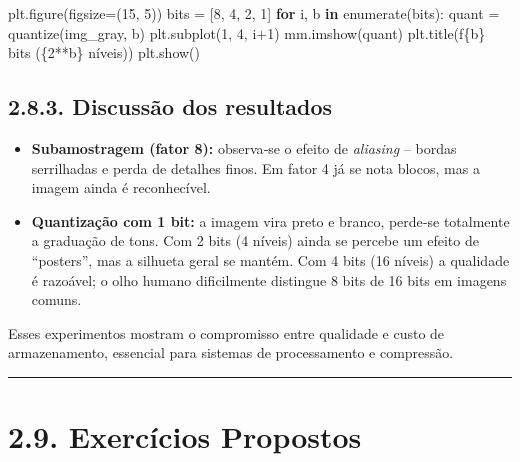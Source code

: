 \documentclass[
  portuguese,
  letterpaper,
  openany,
  oneside,
  12pt,
  a4paper]{book}
\newenvironment{Shaded}{\begin{snugshade}}{\end{snugshade}}
\newcommand{\BuiltInTok}[1]{\textcolor[rgb]{0.00,0.23,0.31}{#1}}
\newcommand{\ControlFlowTok}[1]{\textcolor[rgb]{0.00,0.23,0.31}{\textbf{#1}}}
\newcommand{\DecValTok}[1]{\textcolor[rgb]{0.68,0.00,0.00}{#1}}
\newcommand{\KeywordTok}[1]{\textcolor[rgb]{0.00,0.23,0.31}{\textbf{#1}}}
\newcommand{\NormalTok}[1]{\textcolor[rgb]{0.00,0.23,0.31}{#1}}
\newcommand{\OperatorTok}[1]{\textcolor[rgb]{0.37,0.37,0.37}{#1}}
\newcommand{\SpecialCharTok}[1]{\textcolor[rgb]{0.37,0.37,0.37}{#1}}
\newcommand{\SpecialStringTok}[1]{\textcolor[rgb]{0.13,0.47,0.30}{#1}}
\providecommand{\tightlist}{%
  \setlength{\itemsep}{0pt}\setlength{\parskip}{0pt}}
\begin{document}
\begin{tcolorbox}
\begin{Shaded}
\begin{Highlighting}[]
\NormalTok{plt.figure(figsize}\OperatorTok{=}\NormalTok{(}\DecValTok{15}\NormalTok{, }\DecValTok{5}\NormalTok{))}
\NormalTok{bits }\OperatorTok{=}\NormalTok{ [}\DecValTok{8}\NormalTok{, }\DecValTok{4}\NormalTok{, }\DecValTok{2}\NormalTok{, }\DecValTok{1}\NormalTok{]}
\ControlFlowTok{for}\NormalTok{ i, b }\KeywordTok{in} \BuiltInTok{enumerate}\NormalTok{(bits):}
\NormalTok{    quant }\OperatorTok{=}\NormalTok{ quantize(img\_gray, b)}
\NormalTok{    plt.subplot(}\DecValTok{1}\NormalTok{, }\DecValTok{4}\NormalTok{, i}\OperatorTok{+}\DecValTok{1}\NormalTok{)}
\NormalTok{    mm.imshow(quant)}
\NormalTok{    plt.title(}\SpecialStringTok{f\textquotesingle{}}\SpecialCharTok{\{}\NormalTok{b}\SpecialCharTok{\}}\SpecialStringTok{ bits (}\SpecialCharTok{\{}\DecValTok{2}\OperatorTok{**}\NormalTok{b}\SpecialCharTok{\}}\SpecialStringTok{ níveis)\textquotesingle{}}\NormalTok{)}
\NormalTok{plt.show()}
\end{Highlighting}
\end{Shaded}

\subsection{2.8.3. Discussão dos
resultados}\label{discussuxe3o-dos-resultados}

\begin{itemize}
\tightlist
\item
  \textbf{Subamostragem (fator 8):} observa‑se o efeito de
  \emph{aliasing} -- bordas serrilhadas e perda de detalhes finos. Em
  fator 4 já se nota blocos, mas a imagem ainda é reconhecível.
\item
  \textbf{Quantização com 1 bit:} a imagem vira preto e branco, perde‑se
  totalmente a graduação de tons. Com 2 bits (4 níveis) ainda se percebe
  um efeito de ``posters'', mas a silhueta geral se mantém. Com 4 bits
  (16 níveis) a qualidade é razoável; o olho humano dificilmente
  distingue 8 bits de 16 bits em imagens comuns.
\end{itemize}

Esses experimentos mostram o compromisso entre qualidade e custo de
armazenamento, essencial para sistemas de processamento e compressão.

\begin{center}\rule{0.5\linewidth}{0.5pt}\end{center}

\section{2.9. Exercícios Propostos}\label{exercuxedcios-propostos}


\end{tcolorbox}
\end{document}
